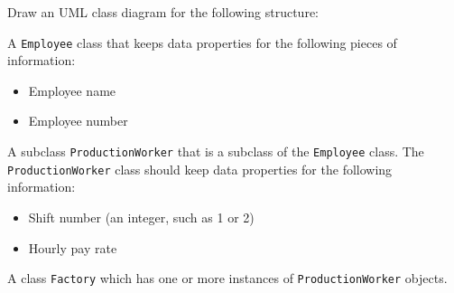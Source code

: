 Draw an UML class diagram for the following structure:

A \texttt{Employee} class that keeps data properties for the following pieces of information: 
\begin{itemize}
\item Employee name
\item Employee number
\end{itemize}

A subclass \texttt{ProductionWorker} that is a subclass of the \texttt{Employee} class. The \texttt{ProductionWorker} class should keep data properties for the following information:
\begin{itemize}
\item Shift number (an integer, such as 1 or 2)
\item Hourly pay rate
\end{itemize}

A class \texttt{Factory} which has one or more instances of \texttt{ProductionWorker} objects.
